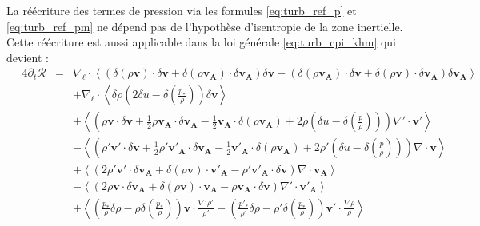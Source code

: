 La réécriture des termes de pression via les formules \eqref{eq:turb_ref_p} et \eqref{eq:turb_ref_pm} ne dépend pas de l'hypothèse d'isentropie de la zone inertielle. Cette réécriture est aussi applicable dans la loi  générale \eqref{eq:turb_cpi_khm} qui devient :
\begin{equation}
\boxed{
\begin{array}{lcl}
\label{eq:turb_cpi_khm2}\quad 4\partial_t \mathcal{R} &=&  \nabla_{\boldsymbol{\ell}} \cdot \left<\left(\delta \left(\rho\boldsymbol{v}\right) \cdot \delta \boldsymbol{v}+ \delta \left(\rho\boldsymbol{v_A}\right) \cdot \delta \boldsymbol{v_A}\right) \delta \boldsymbol{v}  -\left(\delta \left(\rho\boldsymbol{v_A}\right) \cdot \delta \boldsymbol{v}  + \delta \left(\rho\boldsymbol{v}\right) \cdot \delta \boldsymbol{v_A}  \right) \delta \boldsymbol{v_A} \right>\\
&& + \nabla_{\boldsymbol{\ell}} \cdot \left<\delta \rho  \left(2\delta u - \delta \left(\frac{p_*}{\rho}\right)\right)\delta \boldsymbol{v}\right> \\
&& +\left< \left(\rho \boldsymbol{v} \cdot \delta \boldsymbol{v} +\frac{1}{2} \rho \boldsymbol{v_A} \cdot \delta \boldsymbol{v_A} -\frac{1}{2} \boldsymbol{v_A} \cdot \delta \left(\rho \boldsymbol{v_A}\right) + 2\rho \left(\delta u - \delta \left(\frac{p}{\rho}\right)\right) \right) \nabla' \cdot \boldsymbol{v'} \right>\\
&& -\left<\left( \rho' \boldsymbol{v'} \cdot \delta \boldsymbol{v} +\frac{1}{2} \rho' \boldsymbol{v'_A} \cdot \delta \boldsymbol{v_A} -\frac{1}{2} \boldsymbol{v'_A} \cdot \delta \left(\rho \boldsymbol{v_A}\right) + 2\rho' \left(\delta u - \delta \left(\frac{p}{\rho}\right)\right)  \right)\nabla \cdot \boldsymbol{v}\right>\\
&&+ \left<\left(2 \rho' \boldsymbol{v'} \cdot \delta \boldsymbol{v_A}+ \delta\left(\rho \boldsymbol{v}\right) \cdot \boldsymbol{v'_A} - \rho' \boldsymbol{v'_A} \cdot \delta \boldsymbol{v}  \right)\nabla \cdot \boldsymbol{v_A}\right>\\
&&- \left<\left(2\rho \boldsymbol{v} \cdot \delta \boldsymbol{v_A} + \delta\left(\rho \boldsymbol{v}\right) \cdot \boldsymbol{v_A} - \rho \boldsymbol{v_A} \cdot \delta \boldsymbol{v}  \right)\nabla' \cdot \boldsymbol{v'_A}\right> \\
&&+  \left< \left(\frac{p_*}{\rho} \delta \rho - \rho \delta \left(\frac{p_*}{\rho}\right)  \right)\boldsymbol{v} \cdot \frac{\nabla' \rho'}{\rho'} - \left(\frac{p'_*}{\rho'} \delta \rho - \rho' \delta \left(\frac{p_*}{\rho}\right)  \right)  \boldsymbol{v'} \cdot \frac{\nabla \rho}{\rho} \right>\\

\end{array}}
\end{equation}
